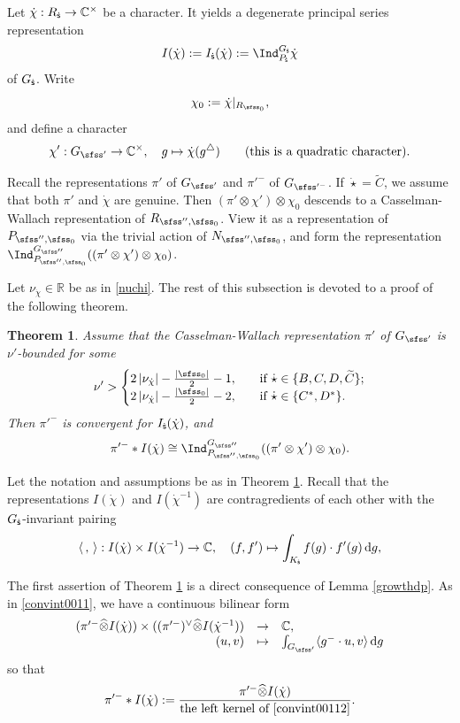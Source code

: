 \documentclass[11pt,a4paper]{amsart}
\def\abs#1{\left|{#1}\right|}
\newcommand{\od}{\operatorname{d}}
\newcommand{\R}{\mathbb R}
\newcommand{\la}{\langle}
\newcommand{\ra}{\rangle}
\newcommand{\be}{\begin {equation}}
\newcommand{\ee}{\end {equation}}
\numberwithin{equation}{section}
\newtheorem{thm}{Theorem}[section]
\theoremstyle{remark}
\begin{document}
Let $\dot \chi: R_{{\dot{\mathsf s}}}\rightarrow \mathbb{C}^\times $ be a character. It yields a degenerate principal series representation
\[
I(\dot \chi):=I_{\dsfss}(\dot \chi):=\Ind_{P_\dsfss}^{G_\dsfss} \dot \chi
\]
 of $G_{\dot{\mathsf s}}$.
Write
\be\label{chi0}
  \chi_0:=\dot \chi|_{R_{\sfss_0}},
\ee
and define a character
\be\label{chip}
 \chi':  G_{\sfss'}\rightarrow \C^\times, \quad g\mapsto \dot \chi(g^\triangle) \qquad(\textrm{this is a quadratic character}).
\ee

Recall the representations  $\pi'$  of $G_{\sfss'}$ and
$\pi'^-$ of $G_{\sfss'^-}$. If $\dot \star =\widetilde C$, we assume that both $\pi'$ and $\dot \chi$ are genuine.  Then $(\pi'\otimes \chi') \otimes \chi_0$ descends to a Casselman-Wallach representation of $R_{\sfss'',\sfss_0}$. View it as a representation of $P_{\sfss'',\sfss_0}$ via the trivial action of $N_{\sfss'',\sfss_0}$, and form the representation  $\Ind_{P_{\sfss'',\sfss_0}}^{G_{\sfss''}} ((\pi'\otimes \chi') \otimes \chi_0)$.


Let $\nu_{\dot \chi}\in \R$ be  as in \eqref{nuchi}. The rest of this subsection is devoted to a proof of the following theorem.

\begin{thm}\label{midp}
Assume that the Casselman-Wallach representation $\pi'$ of $G_{\sfss'}$ is $\nu'$-bounded for some
\[
 \nu'>\begin{cases}
  2\abs{\nu_{\dot \chi}}- \frac{\abs{\sfss_0}}{2}-1,\quad &\textrm{if $\dot \star\in \{B,C,D, \widetilde C\}$};\\
   2\abs{\nu_{\dot \chi}}- \frac{\abs{\sfss_0}}{2}-2,\quad & \textrm{if $\dot \star\in \{C^*,D^*\}$}.
 \end{cases}
\]
 Then $\pi'^-$ is convergent for $I_{{\dot{\mathsf s}}}(\dot \chi)$, and
\[
 \pi'^-*I(\dot \chi)\cong \Ind_{P_{\sfss'',\sfss_0}}^{G_{\sfss''}} ((\pi'\otimes \chi')\otimes \chi_0).
\]
\end{thm}

Let the notation and assumptions be as in Theorem \ref{midp}.
Recall that the representations   $I(\dot \chi)$ and $ I(\dot \chi^{-1})$ are contragredients of each other with the $G_{\dot{\mathsf s}}$-invariant pairing
 \[
  \la\,,\,\ra:  I(\dot \chi)\times I(\dot \chi^{-1})\rightarrow \C, \quad (f, f')\mapsto \int_{K_\dsfss} f(g) \cdot f'(g) \od\!g,
 \]

The first assertion of Theorem \ref{midp} is a direct consequence of Lemma \ref{growthdp}. As in \eqref{convint0011},  we have a continuous bilinear form
\be\label{convint00112}
\begin{array}{rcl}
(\pi'^- \widehat \otimes{ I(\dot \chi)})\times ((\pi'^-)^\vee \widehat \otimes I(\dot \chi^{-1}) )&\rightarrow &\C,\\
 (u,v)&\mapsto& \int_{G_{\sfss'}} \la g^-\cdot u,v\ra \od\! g
 \end{array}
 \ee
so that
\begin{equation*}%
 \pi'^-*I(\dot \chi):=\frac{\pi'^-\widehat \otimes I(\dot \chi)}{\textrm{the left kernel of \eqref{convint00112}}}.
\end{equation*}
\end{document}
